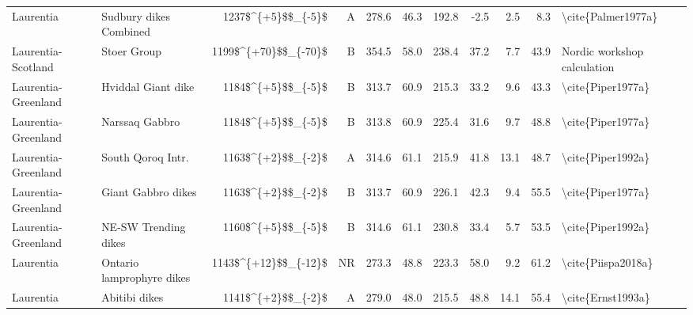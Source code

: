 \begin{longtable}{p{1 in}p{1 in}rrrrrrrr}
                     Laurentia &                           Sudbury dikes Combined &     1237\$\textasciicircum \{+5\}\$\$\_\{-5\}\$ &      A &     278.6 &      46.3 & 192.8 &  -2.5 &       2.5 &         8.3 &                                 \textbackslash cite\{Palmer1977a\} \\
            Laurentia-Scotland &                                      Stoer Group &   1199\$\textasciicircum \{+70\}\$\$\_\{-70\}\$ &      B &     354.5 &      58.0 & 238.4 &  37.2 &       7.7 &        43.9 &                        Nordic workshop calculation \\
           Laurentia-Greenland &                               Hviddal Giant dike &     1184\$\textasciicircum \{+5\}\$\$\_\{-5\}\$ &      B &     313.7 &      60.9 & 215.3 &  33.2 &       9.6 &        43.3 &                                  \textbackslash cite\{Piper1977a\} \\
           Laurentia-Greenland &                                   Narssaq Gabbro &     1184\$\textasciicircum \{+5\}\$\$\_\{-5\}\$ &      B &     313.8 &      60.9 & 225.4 &  31.6 &       9.7 &        48.8 &                                  \textbackslash cite\{Piper1977a\} \\
           Laurentia-Greenland &                                South Qoroq Intr. &     1163\$\textasciicircum \{+2\}\$\$\_\{-2\}\$ &      A &     314.6 &      61.1 & 215.9 &  41.8 &      13.1 &        48.7 &                                  \textbackslash cite\{Piper1992a\} \\
           Laurentia-Greenland &                               Giant Gabbro dikes &     1163\$\textasciicircum \{+2\}\$\$\_\{-2\}\$ &      B &     313.7 &      60.9 & 226.1 &  42.3 &       9.4 &        55.5 &                                  \textbackslash cite\{Piper1977a\} \\
           Laurentia-Greenland &                             NE-SW Trending dikes &     1160\$\textasciicircum \{+5\}\$\$\_\{-5\}\$ &      B &     314.6 &      61.1 & 230.8 &  33.4 &       5.7 &        53.5 &                                  \textbackslash cite\{Piper1992a\} \\
                     Laurentia &                        Ontario lamprophyre dikes &   1143\$\textasciicircum \{+12\}\$\$\_\{-12\}\$ &     NR &     273.3 &      48.8 & 223.3 &  58.0 &       9.2 &        61.2 &                                 \textbackslash cite\{Piispa2018a\} \\
                     Laurentia &                                    Abitibi dikes &     1141\$\textasciicircum \{+2\}\$\$\_\{-2\}\$ &      A &     279.0 &      48.0 & 215.5 &  48.8 &      14.1 &        55.4 &                                  \textbackslash cite\{Ernst1993a\} \\

\end{longtable}
